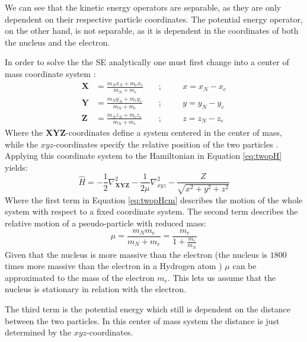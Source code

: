 \documentclass[../master_thesis.tex]{subfiles}
\begin{document}
We can see that the kinetic energy operators are separable, as they are only
dependent on their respective particle coordinates. The potential energy
operator, on the other hand, is not separable, as it is dependent in the
coordinates of both the nucleus and the electron.

In order to solve the the \ac{SE} analytically one must first change into a
center of mass coordinate system :
\begin{equation}
  \begin{aligned} \label{eq:cmparam}
    \mathbf{X} &= \frac{m_Nx_N + m_ex_e}{m_N + m_e} \ &&;\  &&&x= x_N - x_e \\
    \mathbf{Y} &= \frac{m_Ny_N + m_ey_e}{m_N + m_e} \ &&;\  &&&y= y_N - y_e \\
    \mathbf{Z} &= \frac{m_Nz_N + m_ez_e}{m_N + m_e} \ &&;\  &&&z= z_N - z_e
  \end{aligned}
\end{equation}
Where the $\mathbf{XYZ}$-coordinates define a system centered in the center of mass,
while the $xyz$-coordinates specify the relative position of the two particles
\cite{Jensen:2017}. Applying this coordinate system to the Hamiltonian in
Equation \ref{eq:twopH} yields:
\begin{equation}
  \hat{H} = -\frac{1}{2}\nabla^2_{\mathbf{XYZ}} -\frac{1}{2\mu}\nabla^2_{xyz} -
  \frac{Z}{\sqrt{x^2 + y^2 + z^2}}\label{eq:twopHcm}
\end{equation}
Where the first term in Equation \ref{eq:twopHcm} describes the motion of the
whole system with respect to a fixed coordinate system. The second term
describes the relative motion of a pseudo-particle with reduced mass:
\begin{equation}
  \mu = \frac{m_Nm_e}{m_N + m_e} = \frac{m_e}{1 + \frac{m_e}{m_N}}
\end{equation}
Given that the nucleus is more %
 massive than the electron (the nucleus is $1800$
times more massive than the electron in a Hydrogen atom \cite{Jensen:2017})
$\mu$ can be approximated to the mass of the electron $m_e$. This lets us
assume that the nucleus is stationary in relation with the electron.

The third term is the potential energy which still is dependent on the distance
between the two particles. In this center of mass system the distance is just
determined by the $xyz$-coordinates.
\end{document}
